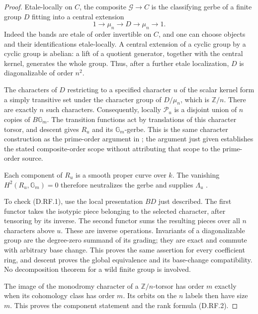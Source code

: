 \begin{proof}
Etale-locally on $C$, the composite $\mathcal G\to C$ is the
classifying gerbe of a finite group $D$ fitting into a central
extension
\[
                    1\to\mu_n\to D\to\mu_n\to1.
                                                               \tag{D.RF.3}
\]
Indeed the bands are etale of order invertible on $C$, and one can
choose objects and their identifications etale-locally. A central
extension of a cyclic group by a cyclic group is abelian: a lift of
a quotient generator, together with the central kernel, generates
the whole group. Thus, after a further etale localization, $D$ is
diagonalizable of order $n^2$.

The characters of $D$ restricting to a specified character $u$ of
the scalar kernel form a simply transitive set under the character
group of $D/\mu_n$, which is $\mathbb Z/n$. There are exactly $n$
such characters. Consequently, locally $\mathcal P_u$ is a disjoint
union of $n$ copies of $B\mathbb G_m$. The transition functions act
by translations of this character torsor, and descent gives $R_u$
and its $\mathbb G_m$-gerbe. This is the same character construction
as the prime-order argument in
\citet[Proposition~5.1.6 and its complete proof, pp.~18--19]
{Lieblich2011ResidualD}; the argument just given establishes the
stated composite-order scope without attributing that scope to the
prime-order source.

Each component of $R_u$ is a smooth proper curve over $k$.
The vanishing $H^2(R_u,\mathbb G_m)=0$ therefore neutralizes the
gerbe and supplies $\Lambda_u$
\citep[Theorem~59.68.5 and its complete derivation in
Section~59.68, Tags 03RM and 03RH]{StacksResidualFrobeniusD}.

To check (D.RF.1), use the local presentation $BD$ just described.
The first functor takes the isotypic piece belonging to the selected
character, after tensoring by its inverse. The second functor sums
the resulting pieces over all $n$ characters above $u$. These are
inverse operations. Invariants of a diagonalizable group are the
degree-zero summand of its grading; they are exact and commute with
arbitrary base change. This proves the same assertion for every
coefficient ring, and descent proves the global equivalence and its
base-change compatibility. No decomposition theorem for a wild
finite group is involved.

The image of the monodromy character of a $\mathbb Z/n$-torsor has
order $m$ exactly when its cohomology class has order $m$. Its orbits
on the $n$ labels then have size $m$. This proves the component
statement and the rank formula (D.RF.2).
\end{proof}

